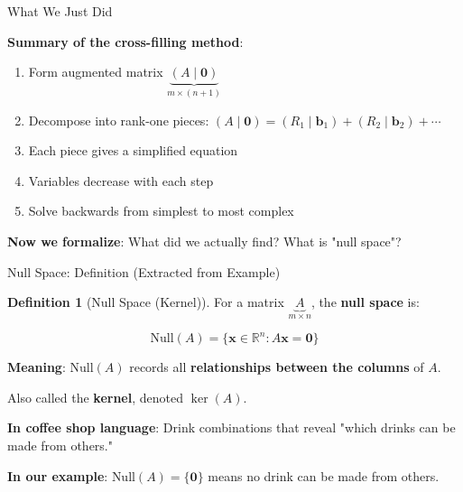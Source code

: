 \documentclass[10pt]{beamer}
\theoremstyle{definition}
\newtheorem{defi}{Definition}[section]
\newcommand{\x}[1]{\alert{\textbf{#1}}}
\begin{document}
\begin{frame}{What We Just Did}

\x{Summary of the cross-filling method}:

\begin{enumerate}
\item Form augmented matrix $\underbrace{(A \mid \mathbf{0})}_{m \times (n+1)}$
\item Decompose into rank-one pieces: $(A \mid \mathbf{0}) = (R_1 \mid \mathbf{b}_1) + (R_2 \mid \mathbf{b}_2) + \cdots$
\item Each piece gives a simplified equation
\item Variables decrease with each step
\item Solve backwards from simplest to most complex
\end{enumerate}

\vspace{1em}

\x{Now we formalize}: What did we actually find? What is "null space"?

\end{frame}


\begin{frame}{Null Space: Definition (Extracted from Example)}

\begin{defi}[Null Space (Kernel)]
For a matrix $\underbrace{A}_{m \times n}$, the \x{null space} is:

$$\text{Null}(A) = \{\mathbf{x} \in \mathbb{R}^n : A\mathbf{x} = \mathbf{0}\}$$

\textbf{Meaning}: $\text{Null}(A)$ records all \x{relationships between the columns} of $A$.

Also called the \x{kernel}, denoted $\ker(A)$.
\end{defi}

\vspace{0.5em}

\x{In coffee shop language}: Drink combinations that reveal "which drinks can be made from others."

\vspace{0.5em}

\x{In our example}: $\text{Null}(A) = \{\mathbf{0}\}$ means no drink can be made from others.

\end{frame}
\end{document}
